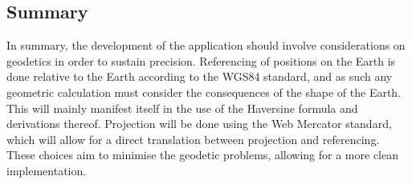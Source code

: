 \subsection{Summary}

In summary, the development of the application should involve considerations on geodetics in order to sustain precision. Referencing of positions on the Earth is done relative to the Earth according to the WGS84 standard, and as such any geometric calculation must consider the consequences of the shape of the Earth. This will mainly manifest itself in the use of the Haversine formula and derivations thereof. Projection will be done using the Web Mercator standard, which will allow for a direct translation between projection and referencing. These choices aim to minimise the geodetic problems, allowing for a more clean implementation.




































































